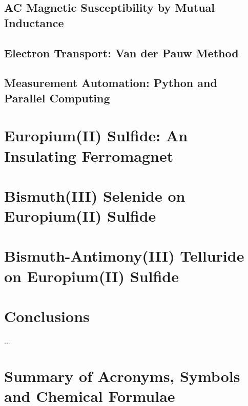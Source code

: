 \documentclass{report}
\begin{document}
    \section{AC Magnetic Susceptibility by Mutual Inductance}
    \section{Electron Transport: Van der Pauw Method}
    \section{Measurement Automation: Python and Parallel Computing}

\chapter{Europium(II) Sulfide: An Insulating Ferromagnet}
\label{ch:EuS}

\chapter{Bismuth(III) Selenide on Europium(II) Sulfide}
\label{ch:bilayer2014}


\chapter{Bismuth-Antimony(III) Telluride on Europium(II) Sulfide}
\label{ch:bilayer2018}

\chapter{Conclusions}
\label{ch:conclusions}
     ...
\appendix
\chapter{Summary of Acronyms, Symbols and Chemical Formulae}
    

\printbibliography
\end{document}
